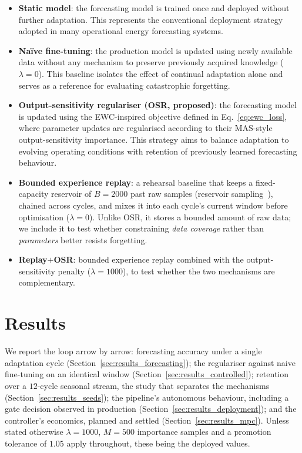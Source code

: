 \documentclass[journal]{IEEEtran}
\newcommand{\ewclambda}{\lambda}
\begin{document}
\begin{itemize}
    \item \textbf{Static model}: the forecasting model is trained once
    and deployed without further adaptation. This represents the
    conventional deployment strategy adopted in many operational energy
    forecasting systems.

    \item \textbf{Na\"ive fine-tuning}: the production model is updated
    using newly available data without any mechanism to preserve
    previously acquired knowledge ($\ewclambda=0$). This baseline isolates
    the effect of continual adaptation alone and serves as a reference for
    evaluating catastrophic forgetting.

    \item \textbf{Output-sensitivity regulariser (OSR, proposed)}: the
    forecasting model is updated using the EWC-inspired objective defined
    in Eq.~\eqref{eq:ewc_loss}, where parameter updates are regularised
    according to their MAS-style output-sensitivity importance. This
    strategy aims to balance adaptation to evolving operating conditions
    with retention of previously learned forecasting behaviour.

    \item \textbf{Bounded experience replay}: a rehearsal baseline that
    keeps a fixed-capacity reservoir of $B{=}2000$ past raw samples
    (reservoir sampling~\cite{lopezpaz2017gradient}), chained across cycles,
    and mixes it into each cycle's current window before optimisation
    ($\ewclambda{=}0$). Unlike OSR, it stores a bounded amount of raw data;
    we include it to test whether constraining \emph{data coverage} rather
    than \emph{parameters} better resists forgetting.

    \item \textbf{Replay${+}$OSR}: bounded experience replay combined with the
    output-sensitivity penalty ($\ewclambda{=}1000$), to test whether the two
    mechanisms are complementary.
\end{itemize}



\section{Results}
\label{sec:results}
We report the loop arrow by arrow: forecasting accuracy under a single
adaptation cycle (Section~\ref{sec:results_forecasting}); the regulariser
against naive fine-tuning on an identical window
(Section~\ref{sec:results_controlled}); retention over a $12$-cycle seasonal
stream, the study that separates the mechanisms
(Section~\ref{sec:results_seeds}); the pipeline's autonomous behaviour, including
a gate decision observed in production
(Section~\ref{sec:results_deployment}); and the controller's economics, planned
and settled (Section~\ref{sec:results_mpc}). Unless stated otherwise
$\ewclambda = 1000$, $M = 500$ importance samples and a promotion tolerance of
$1.05$ apply throughout, these being the deployed values.
\end{document}
